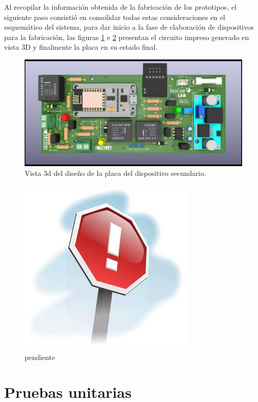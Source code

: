 Al recopilar la información obtenida de la fabricación de los prototipos, el siguiente paso consistió en consolidar todas estas consideraciones en el esquemático del sistema, para dar inicio a la fase de elaboración de dispositivos para la fabricación, las figuras \ref{fig:figura_h} e \ref{fig:figura_i} presentan el circuito impreso generado en vista 3D y finalmente la placa en su estado final.

\begin{figure}[ht]
	\centering
	\includegraphics[scale=.25]{./Figures/Capitulo4/Figura_H.png}
	\caption{Vista 3d del diseño de la placa del dispositivo secundario.}
	\label{fig:figura_h}
\end{figure}

\begin{figure}[ht]
	\centering
	\includegraphics[scale=.3]{./Figures/Capitulo4/pendiente.jpg}
	\caption{pendiente}
	\label{fig:figura_i}
\end{figure}


\section{Pruebas unitarias}


